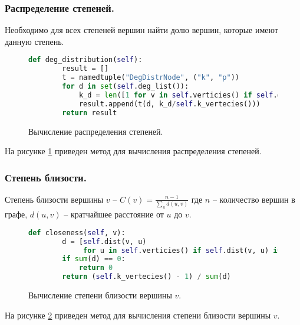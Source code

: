 \subsubsection{Распределение степеней.}
Необходимо для всех степеней вершин найти долю вершин,
которые имеют данную степень.
\begin{figure}[H] 
\begin{lstlisting}[language=Python] 
    def deg_distribution(self):
        result = []
        t = namedtuple("DegDistrNode", ("k", "p"))
        for d in set(self.deg_list()):
            k_d = len([1 for v in self.verticies() if self.deg(v) == d])
            result.append(t(d, k_d/self.k_vertecies()))
        return result
\end{lstlisting}  
    \caption{Вычисление распределения степеней.}
    \label{degdistr}
\end{figure} 
На рисунке \ref{degdistr}  приведен метод для вычисления
распределения степеней.
\subsubsection{Степень близости.}
Степень близости вершины $v$  --  $C(v) = \frac{n - 1}{\sum_{u} d(u,v)}$ 
где $n$ -- количество вершин в графе,  $d(u,v)$ -- 
кратчайшее расстояние от  $u$ до  $v$.
\begin{figure}[H] 
\begin{lstlisting}[language=Python] 
    def closeness(self, v):
        d = [self.dist(v, u)
             for u in self.verticies() if self.dist(v, u) is not None]
        if sum(d) == 0:
            return 0
        return (self.k_vertecies() - 1) / sum(d)
\end{lstlisting}  
    \caption{Вычисление степени близости вершины $v$.}
    \label{closeg}
\end{figure} 
На рисунке \ref{closeg} приведен метод для вычисления степени
близости вершины $v$.
